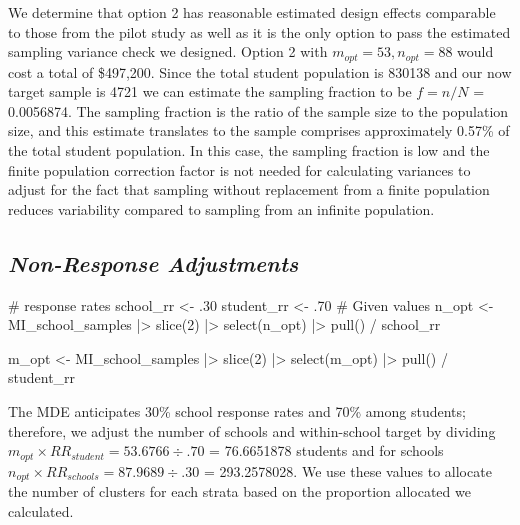 \documentclass[
  12pt]{article}
\newenvironment{Shaded}{\begin{snugshade}}{\end{snugshade}}
\newcommand{\CommentTok}[1]{\textcolor[rgb]{0.37,0.37,0.37}{#1}}
\newcommand{\DecValTok}[1]{\textcolor[rgb]{0.68,0.00,0.00}{#1}}
\newcommand{\FunctionTok}[1]{\textcolor[rgb]{0.28,0.35,0.67}{#1}}
\newcommand{\NormalTok}[1]{\textcolor[rgb]{0.00,0.23,0.31}{#1}}
\newcommand{\OtherTok}[1]{\textcolor[rgb]{0.00,0.23,0.31}{#1}}
\newcommand{\SpecialCharTok}[1]{\textcolor[rgb]{0.37,0.37,0.37}{#1}}
\begin{document}
We determine that option 2 has reasonable estimated design effects
comparable to those from the pilot study as well as it is the only
option to pass the estimated sampling variance check we designed. Option
2 with \(m_{opt} = 53, n_{opt} = 88\) would cost a total of \$497,200.
Since the total student population is 830138 and our now target sample
is 4721 we can estimate the sampling fraction to be \(f = n/N\) =
0.0056874. The sampling fraction is the ratio of the sample size to the
population size, and this estimate translates to the sample comprises
approximately 0.57\% of the total student population. In this case, the
sampling fraction is low and the finite population correction factor is
not needed for calculating variances to adjust for the fact that
sampling without replacement from a finite population reduces
variability compared to sampling from an infinite population.

\subsection{\texorpdfstring{\emph{Non-Response
Adjustments}}{Non-Response Adjustments}}\label{non-response-adjustments}

\begin{Shaded}
\begin{Highlighting}[]
\CommentTok{\# response rates}
\NormalTok{school\_rr }\OtherTok{\textless{}{-}}\NormalTok{ .}\DecValTok{30}
\NormalTok{student\_rr }\OtherTok{\textless{}{-}}\NormalTok{ .}\DecValTok{70}
\CommentTok{\# Given values}
\NormalTok{n\_opt }\OtherTok{\textless{}{-}}\NormalTok{ MI\_school\_samples }\SpecialCharTok{|\textgreater{}} 
  \FunctionTok{slice}\NormalTok{(}\DecValTok{2}\NormalTok{) }\SpecialCharTok{|\textgreater{}} \FunctionTok{select}\NormalTok{(n\_opt) }\SpecialCharTok{|\textgreater{}} 
  \FunctionTok{pull}\NormalTok{() }\SpecialCharTok{/}\NormalTok{ school\_rr}

\NormalTok{m\_opt }\OtherTok{\textless{}{-}}\NormalTok{ MI\_school\_samples }\SpecialCharTok{|\textgreater{}} 
  \FunctionTok{slice}\NormalTok{(}\DecValTok{2}\NormalTok{) }\SpecialCharTok{|\textgreater{}} \FunctionTok{select}\NormalTok{(m\_opt) }\SpecialCharTok{|\textgreater{}} 
  \FunctionTok{pull}\NormalTok{() }\SpecialCharTok{/}\NormalTok{ student\_rr}
\end{Highlighting}
\end{Shaded}

The MDE anticipates 30\% school response rates and 70\% among students;
therefore, we adjust the number of schools and within-school target by
dividing\(m_{opt} \times RR_{student} = 53.6766 \div .70\) = 76.6651878
students and for schools
\(n_{opt} \times RR_{schools} =  87.9689 \div .30\) = 293.2578028. We
use these values to allocate the number of clusters for each strata
based on the proportion allocated we calculated.
\end{document}
